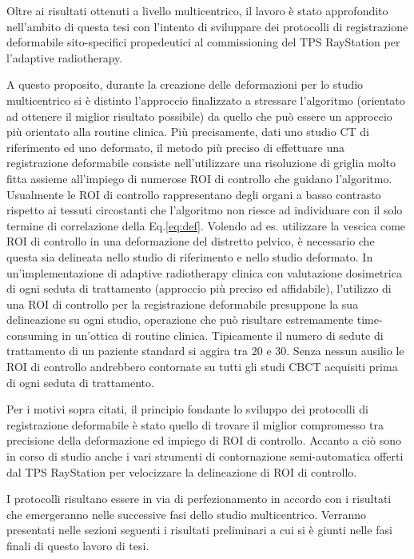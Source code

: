Oltre ai risultati ottenuti a livello multicentrico, il lavoro è stato approfondito nell'ambito di questa tesi con l'intento di sviluppare dei protocolli di registrazione deformabile sito-specifici propedeutici al commissioning del TPS RayStation per l'adaptive radiotherapy. 

A questo proposito, durante la creazione delle deformazioni per lo studio multicentrico si è distinto l'approccio finalizzato a stressare l'algoritmo (orientato ad ottenere il miglior risultato possibile) da quello che può essere un approccio più orientato alla routine clinica. Più precisamente, dati uno studio CT di riferimento ed uno deformato, il metodo più preciso di effettuare una registrazione deformabile consiste nell'utilizzare una risoluzione di griglia molto fitta assieme all'impiego di numerose ROI di controllo che guidano l'algoritmo. Usualmente le ROI di controllo rappresentano degli organi a basso contrasto rispetto ai tessuti circostanti che l'algoritmo non riesce ad individuare con il solo termine di correlazione della Eq.\eqref{eq:def}. Volendo ad es. utilizzare la vescica come ROI di controllo in una deformazione del distretto pelvico, è necessario che questa sia delineata nello studio di riferimento e nello studio deformato. In un'implementazione di adaptive radiotherapy clinica con valutazione dosimetrica di ogni seduta di trattamento (approccio più preciso ed affidabile), l'utilizzo di una ROI di controllo per la registrazione deformabile presuppone la sua delineazione su ogni studio, operazione che può risultare estremamente time-consuming in un'ottica di routine clinica. Tipicamente il numero di sedute di trattamento di un paziente standard si aggira tra 20 e 30. Senza nessun ausilio le ROI di controllo andrebbero contornate su tutti gli studi CBCT acquisiti prima di ogni seduta di trattamento.

Per i motivi sopra citati, il principio fondante lo sviluppo dei protocolli di registrazione deformabile è stato quello di trovare il miglior compromesso tra precisione della deformazione ed impiego di ROI di controllo. Accanto a ciò sono in corso di studio anche i vari strumenti di contornazione semi-automatica offerti dal TPS RayStation per velocizzare la delineazione di ROI di controllo.

I protocolli risultano essere in via di perfezionamento in accordo con i risultati che emergeranno nelle successive fasi dello studio multicentrico. Verranno presentati nelle sezioni seguenti i risultati preliminari a cui si è giunti nelle fasi finali di questo lavoro di tesi. 

